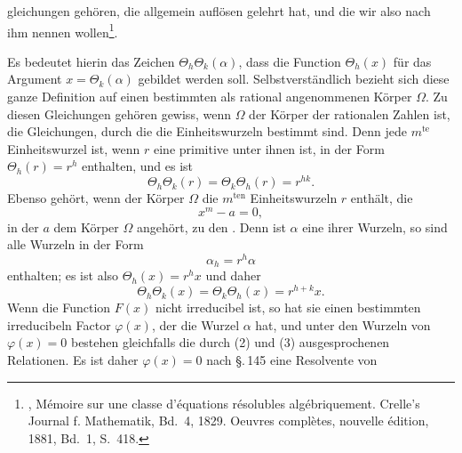 
gleichungen gehören, die  allgemein auflösen gelehrt hat, und die wir also nach ihm  nennen wollen\footnote{, Mémoire sur une classe d'équations résolubles algébriquement. Crelle's Journal f. Mathematik, Bd.~4, 1829. Oeuvres complètes, nouvelle édition, 1881, Bd.~1, S.~418.}.


Es bedeutet hierin das Zeichen $\Theta_h\Theta_k(\alpha)$, dass die Function $\Theta_h(x)$ für das Argument $x = \Theta_k(\alpha)$ gebildet werden soll. Selbstverständlich bezieht sich diese ganze Definition auf einen bestimmten als rational angenommenen Körper $\Omega$. Zu diesen Gleichungen gehören gewiss, wenn $\Omega$ der Körper der rationalen Zahlen ist, die Gleichungen, durch die die Einheitswurzeln bestimmt sind. Denn jede $m^{\mathrm{te}}$ Einheitswurzel ist, wenn $r$ eine primitive unter ihnen ist, in der Form $\Theta_h(r) = r^h$ enthalten, und es ist
\[
\Theta_h\Theta_k(r) = \Theta_k\Theta_h(r) = r^{hk}.
\]
Ebenso gehört, wenn der Körper $\Omega$ die $m^{\mathrm{ten}}$ Einheitswurzeln $r$ enthält, die 
\[
x^m - a = 0,
\]
in der $a$ dem Körper $\Omega$ angehört, zu den . Denn ist $\alpha$ eine ihrer Wurzeln, so sind alle Wurzeln in der Form
\[
\alpha_h = r^h\alpha
\]
enthalten; es ist also $\Theta_h(x) = r^hx$ und daher
\[
\Theta_h\Theta_k(x) = \Theta_k\Theta_h(x) = r^{h+k}x.
\]
Wenn die Function $F(x)$ nicht irreducibel ist, so hat sie einen bestimmten irreducibeln Factor $\varphi(x)$, der die Wurzel $\alpha$ hat, und unter den Wurzeln von $\varphi(x) = 0$ bestehen gleichfalls die durch (2) und (3) ausgesprochenen Relationen. Es ist daher $\varphi(x) = 0$ nach \S.\,145 eine  Resolvente von
